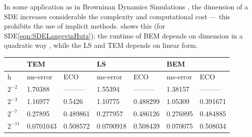 \documentclass[sort&compress, preprint]{elsarticle}
\theoremstyle{definition}
\theoremstyle{plain}%
\theoremstyle{remark}
\newcommand{\SM}{LS\xspace}
\begin{document}
In some application as in Browninan Dynamics Simulations \cite{Cruz2012}, the dimension of a SDE
increases considerable the complexity and computational cost --- this prohibits the use of implicit methods.
 shows this (for SDE\eqref{eqn:SDELangevinHutz}): the runtime of BEM depends on 
dimension in a quadratic way , while the \SM and TEM depends on linear form.     
\begin{table}[t]
	\centering
	\begin{tabular}{lllllll}
		&        TEM &        	& LS		&           & BEM		 &         \\
		\toprule
		h		& ms-error	 & ECO 		& ms-error	& ECO		& ms-error	 &	ECO	  \\
		\midrule
		$2^{-2}$	& \num{1.70388}    & ---------		& \num{1.55394}		& ---------		& \num{1.38157}	& 
		--------- \\
		$2^{-3}$	& \num{1.16977}    & \num{0.5426}   & \num{1.10775}    & \num{0.488299} & \num{1.05309}	& 
		\num{0.391671} \\ 
		$2^{-7}$	&\num{0.27895}     & \num{0.489861} & \num{0.277957}   & \num{0.486126} & \num{0.276895}& 
		\num{0.484885} \\
		$2^{-11}$	& \num{0.0701043}  & \num{0.508572} & \num{0.0700918}  & \num{0.508439} & \num{0.070075} & 
		\num{0.508034} \\

\end{tabular}
\end{table}
\end{document}
